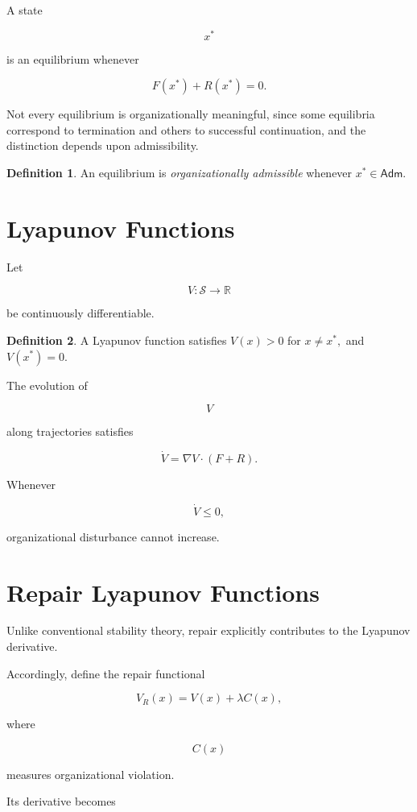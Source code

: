 \documentclass[11pt,oneside]{book}
\numberwithin{equation}{chapter}
\theoremstyle{definition}
\newtheorem{definition}{Definition}[chapter]
\theoremstyle{plain}
\newcommand{\Adm}{\mathsf{Adm}}
\begin{document}
A state

\[
x^\ast
\]

is an equilibrium whenever

\[
F(x^\ast)
+
R(x^\ast)
=
0.
\]

Not every equilibrium is organizationally meaningful, since some equilibria correspond to termination and others to successful continuation, and the distinction depends upon admissibility.

\begin{definition}
An equilibrium is \emph{organizationally admissible} whenever
\(
x^\ast
\in
\Adm.
\)
\end{definition}

\section{Lyapunov Functions}

Let

\[
V
:
\mathcal S
\rightarrow
\mathbb R
\]

be continuously differentiable.

\begin{definition}
A Lyapunov function satisfies
\(
V(x)
>
0
\)
for
\(
x
\neq
x^\ast,
\)
and
\(
V(x^\ast)
=
0.
\)
\end{definition}

The evolution of

\[
V
\]

along trajectories satisfies

\[
\dot V
=
\nabla V
\cdot
(F+R).
\]

Whenever

\[
\dot V
\le
0,
\]

organizational disturbance cannot increase.

\section{Repair Lyapunov Functions}

Unlike conventional stability theory, repair explicitly contributes to the
Lyapunov derivative.

Accordingly, define the repair functional

\[
V_R(x)
=
V(x)
+
\lambda
C(x),
\]

where

\[
C(x)
\]

measures organizational violation.

Its derivative becomes
\end{document}
